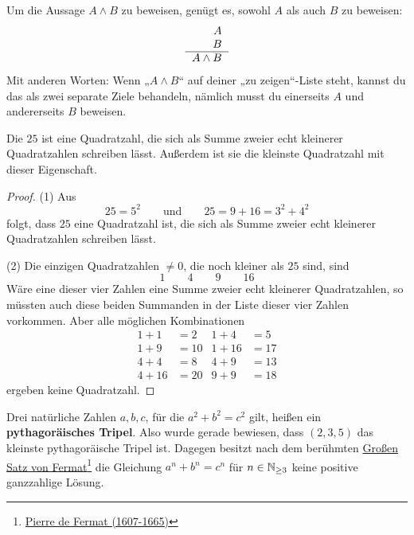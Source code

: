 \begin{axiom} \label{undbeweise}
    Um die Aussage $A\land B$ zu beweisen, genügt es, sowohl $A$ als auch $B$ zu beweisen:
    \[\begin{tabular}{r}
        $A$ \\
        $B$ \\
        \hline 
        $A\land B$
    \end{tabular} \]
    Mit anderen Worten: Wenn „$A\land B$“ auf deiner „zu zeigen“-Liste steht, kannst du das als zwei separate Ziele behandeln, nämlich musst du einerseits $A$ und andererseits $B$ beweisen.
\end{axiom}


\begin{bsp}[*]
    Die $25$ ist eine Quadratzahl, die sich als Summe zweier echt kleinerer Quadratzahlen schreiben lässt. Außerdem ist sie die kleinste Quadratzahl mit dieser Eigenschaft.
\end{bsp}
\begin{proof}
    (1) Aus
        \[ 25=5^2 \qquad\text{und}\qquad 25 = 9 + 16 = 3^2 + 4^2 \]
    folgt, dass $25$ eine Quadratzahl ist, die sich als Summe zweier echt kleinerer Quadratzahlen schreiben lässt.
    
    (2) Die einzigen Quadratzahlen $\neq 0$, die noch kleiner als $25$ sind, sind
        \[ 1\qquad 4\qquad 9\qquad 16 \]
    Wäre eine dieser vier Zahlen eine Summe zweier echt kleinerer Quadratzahlen, so müssten auch diese beiden Summanden in der Liste dieser vier Zahlen vorkommen. Aber alle möglichen Kombinationen
    \begin{align*}
        1+1 & = 2 & 1+4 & = 5 \\
        1+ 9 & = 10 & 1+16 & = 17 \\
        4 + 4 & = 8 & 4+9 & = 13 \\
        4+16 & = 20 & 9+9 & = 18
    \end{align*}
    ergeben keine Quadratzahl.
\end{proof}


\begin{bem}[*]
    Drei natürliche Zahlen $a,b,c$, für die $a^2+b^2=c^2$ gilt, heißen ein \textbf{pythagoräisches Tripel}. Also wurde gerade bewiesen, dass $(2,3,5)$ das kleinste pythagoräische Tripel ist. Dagegen besitzt nach dem berühmten \href{https://de.wikipedia.org/wiki/Gro\%C3\%9Fer_Fermatscher_Satz}{Großen Satz von Fermat}\footnote{\href{https://de.wikipedia.org/wiki/Pierre_de_Fermat}{Pierre de Fermat (1607-1665)}} die Gleichung $a^n+b^n=c^n$ für $n\in \mathbb N_{\ge 3}$ keine positive ganzzahlige Lösung.
\end{bem}


